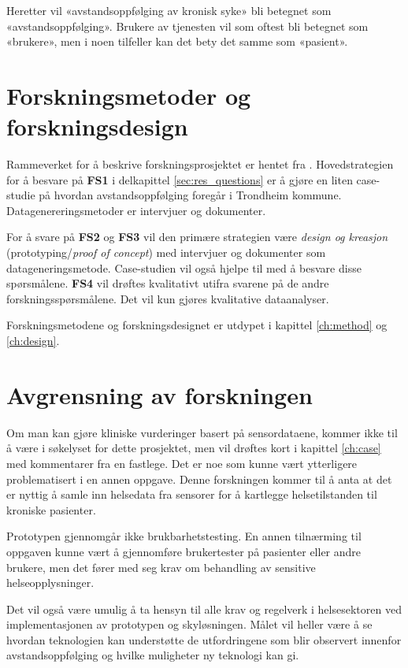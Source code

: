Heretter vil «avstandsoppfølging av kronisk syke» bli betegnet som «avstandsoppfølging». Brukere av tjenesten vil
som oftest bli betegnet som «brukere», men i noen tilfeller kan det bety det samme som «pasient».

\section{Forskningsmetoder og forskningsdesign}
Rammeverket for å beskrive forskningsprosjektet er hentet fra \citet{oates}. Hovedstrategien for å besvare på \textbf{FS1} i
delkapittel \ref{sec:res_questions} er å gjøre en liten case-studie på hvordan avstandsoppfølging foregår i Trondheim kommune. Datagenereringsmetoder
er intervjuer og dokumenter. 

For å svare på \textbf{FS2} og \textbf{FS3} vil den primære strategien være \textit{design og kreasjon} (prototyping/\textit{proof of concept})
med intervjuer og dokumenter som datageneringsmetode. Case-studien vil også hjelpe til med å besvare disse spørsmålene. \textbf{FS4} vil drøftes kvalitativt 
utifra svarene på de andre forskningsspørsmålene. Det vil kun gjøres kvalitative dataanalyser.

Forskningsmetodene og forskningsdesignet er utdypet i kapittel \ref{ch:method} og \ref{ch:design}.

\section{Avgrensning av forskningen}
\label{sec:avgrensning}
Om man kan gjøre kliniske vurderinger basert på sensordataene, kommer ikke til å være i søkelyset for dette prosjektet,
men vil drøftes kort i kapittel \ref{ch:case} med kommentarer fra en fastlege. Det er noe som kunne vært ytterligere problematisert i en annen oppgave.
Denne forskningen kommer til å anta at det er nyttig å samle inn helsedata fra sensorer for å kartlegge helsetilstanden til kroniske pasienter.

Prototypen gjennomgår ikke brukbarhetstesting. En annen tilnærming til oppgaven kunne vært å gjennomføre brukertester på pasienter eller andre brukere, men det
fører med seg krav om behandling av sensitive helseopplysninger.

Det vil også være umulig å ta hensyn til alle krav og regelverk i helsesektoren ved implementasjonen av prototypen og skyløsningen. Målet vil heller
være å se hvordan teknologien kan understøtte de utfordringene som blir observert innenfor avstandsoppfølging og hvilke muligheter ny teknologi kan gi.

